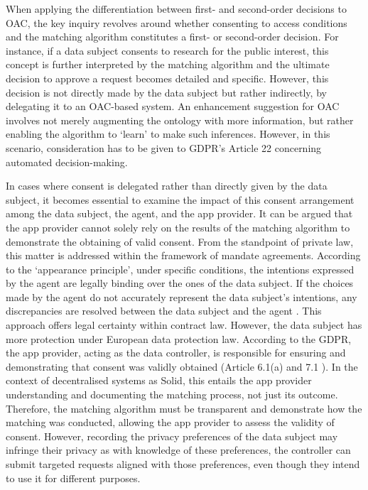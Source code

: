 When applying the differentiation between first- and second-order decisions to OAC, the key inquiry revolves around whether consenting to access conditions and the matching algorithm constitutes a first- or second-order decision.
For instance, if a data subject consents to research for the public interest, this concept is further interpreted by the matching algorithm and the ultimate decision to approve a request becomes detailed and specific.
However, this decision is not directly made by the data subject but rather indirectly, by delegating it to an OAC-based system.
An enhancement suggestion for OAC involves not merely augmenting the ontology with more information, but rather enabling the algorithm to `learn' to make such inferences.
However, in this scenario, consideration has to be given to GDPR's  Article 22 \citeyearpar{noauthor_regulation_2016} concerning automated decision-making.

In cases where consent is delegated rather than directly given by the data subject, it becomes essential to examine the impact of this consent arrangement among the data subject, the agent, and the app provider.
It can be argued that the app provider cannot solely rely on the results of the matching algorithm to demonstrate the obtaining of valid consent.
From the standpoint of private law, this matter is addressed within the framework of mandate agreements.
According to the `appearance principle', under specific conditions, the intentions expressed by the agent are legally binding over the ones of the data subject.
If the choices made by the agent do not accurately represent the data subject's intentions, any discrepancies are resolved between the data subject and the agent \citep{le_metayer_automated_2009}.
This approach offers legal certainty within contract law.
However, the data subject has more protection under European data protection law.
According to the GDPR, the app provider, acting as the data controller, is responsible for ensuring and demonstrating that consent was validly obtained (Article 6.1(a) and 7.1 \citeyearpar{noauthor_regulation_2016}).
In the context of decentralised systems as Solid, this entails the app provider understanding and documenting the matching process, not just its outcome.
Therefore, the matching algorithm must be transparent and demonstrate how the matching was conducted, allowing the app provider to assess the validity of consent.
However, recording the privacy preferences of the data subject may infringe their privacy as with knowledge of these preferences, the controller can submit targeted requests aligned with those preferences, even though they intend to use it for different purposes.

